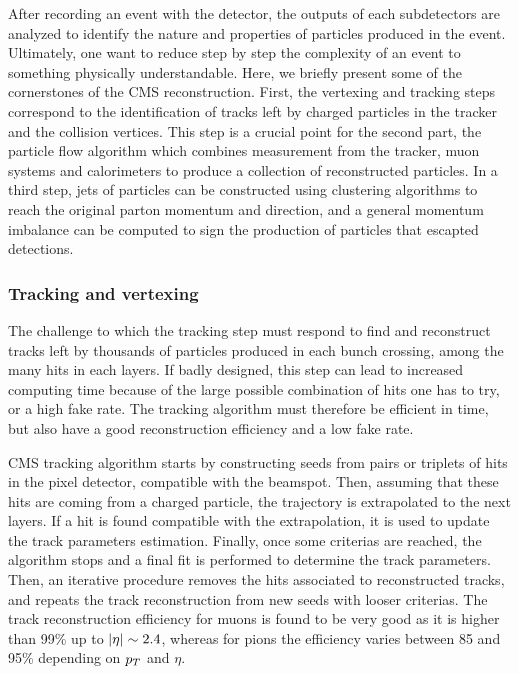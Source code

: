         After recording an event with the detector, the outputs of each subdetectors
        are analyzed to identify the nature and properties of particles produced in the
        event. Ultimately, one want to reduce step by step the complexity of an event to
        something physically understandable. Here, we briefly present some of the
        cornerstones of the CMS reconstruction. First, the vertexing and tracking steps
        correspond to the identification of tracks left by charged particles in the tracker
        and the collision vertices. This step is a crucial point for the second part, the
        particle flow algorithm which combines measurement from the tracker, muon systems
        and calorimeters to produce a collection of reconstructed particles. In a third step,
        jets of particles can be constructed using clustering algorithms to reach the original
        parton momentum and direction, and a general momentum imbalance can be computed
        to sign the production of particles that escapted detections.

            \subsubsection{Tracking and vertexing \label{sec:trackingAndVertexing}}

        The challenge to which the tracking step must respond to find and reconstruct
        tracks left by thousands of particles produced in each bunch crossing, among the
        many hits in each layers. If badly designed, this step can lead to increased
        computing time because of the large possible combination of hits one has to try,
        or a high fake rate. The tracking algorithm must therefore be efficient in time,
        but also have a good reconstruction efficiency and a low fake rate.

        CMS tracking algorithm starts by constructing seeds from pairs or triplets of hits
        in the pixel detector, compatible with the beamspot. Then, assuming that these
        hits are coming from a charged particle, the trajectory is extrapolated to the
        next layers. If a hit is found compatible with the extrapolation, it is used to
        update the track parameters estimation. Finally, once some criterias are reached,
        the algorithm stops and a final fit is performed to determine the track parameters.
        Then, an iterative procedure removes the
        hits associated to reconstructed tracks, and repeats the track reconstruction
        from new seeds with looser criterias.
        The track reconstruction efficiency for muons is found to be very good as it is
        higher than 99\% up to $\left| \eta \right| \sim 2.4$, whereas for pions the efficiency varies
        between 85 and 95\% depending on $p_T$ and $\eta$.

